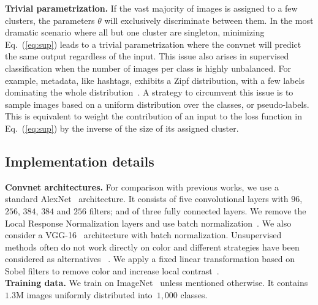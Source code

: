 \noindent\textbf{Trivial parametrization.}
If the vast majority of images is assigned to a few clusters, the parameters $\theta$ will exclusively discriminate between them.
In the most dramatic scenario where all but one cluster are singleton, minimizing Eq.~(\ref{eq:sup}) leads to a
trivial parametrization where the convnet will predict the same output regardless of the input.
This issue also arises in supervised classification when the number of images per class is highly unbalanced.
For example, metadata, like hashtags, exhibits a Zipf distribution, with a few labels dominating the whole distribution~\cite{joulin2016learning}.
A strategy to circumvent this issue is to sample images based on a uniform distribution over the classes, or pseudo-labels.
This is equivalent to weight the contribution of an input to the loss function in Eq.~(\ref{eq:sup}) by the inverse of the size of its assigned cluster.


\subsection{Implementation details}

\noindent\textbf{Convnet architectures.}
For comparison with previous works, we use a standard AlexNet~\cite{krizhevsky2012imagenet} architecture.
It consists of five convolutional layers with $96$, $256$, $384$, $384$ and $256$ filters; and of three fully connected layers.
We remove the Local Response Normalization layers and use batch normalization~\cite{ioffe2015batch}.
We also consider a VGG-16~\cite{simonyan2014very} architecture with batch normalization.
Unsupervised methods often do not work directly on color and different strategies have been considered as alternatives
~\cite{doersch2015unsupervised,noroozi2016unsupervised}.
We apply a fixed linear transformation based on Sobel filters to remove color and increase local contrast~\cite{bojanowski2017unsupervised,paulin2015local}.
\\

\noindent\textbf{Training data.}
We train \OURS on ImageNet~\cite{deng2009imagenet} unless mentioned otherwise.
It contains~$1.3$M images uniformly distributed into~$1,000$ classes.
\\

